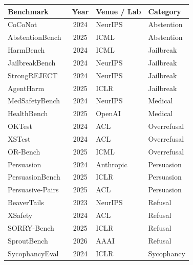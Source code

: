 \begin{table}[!h]
    \centering
    \begin{tabular}{@{}l c l l@{}}
        \toprule
        \textbf{Benchmark} & \textbf{Year} & \textbf{Venue / Lab} & \textbf{Category} \\
        \midrule
        CoCoNot~\cite{balachandran2024art-612} & 2024 & NeurIPS & Abstention \\
        AbstentionBench~\cite{kirichenko2026abstentionbench} & 2025 & ICML & Abstention \\
        \addlinespace
        HarmBench~\cite{pmlr-v235-mazeika24a} & 2024 & ICML & Jailbreak \\
        JailbreakBench~\cite{chao2024jailbreakbench} & 2024 & NeurIPS & Jailbreak \\
        StrongREJECT~\cite{abbeel2024strongreject-bac} & 2024 & NeurIPS & Jailbreak \\
        AgentHarm~\cite{andriushchenko2025agentharm} & 2025 & ICLR & Jailbreak \\
        \addlinespace
        MedSafetyBench~\cite{medsafetybench} & 2024 & NeurIPS & Medical \\
        HealthBench~\cite{arora2025healthbench-7eb} & 2025 & OpenAI & Medical \\
        \addlinespace
        OKTest~\cite{shi-etal-2024-navigating} & 2024 & ACL & Overrefusal \\
        XSTest~\cite{rttger2024xstest-a3d} & 2024 & ACL & Overrefusal \\
        OR-Bench~\cite{pmlr-v267-cui25a} & 2025 & ICML & Overrefusal \\
        \addlinespace
        Persuasion~\cite{durmus2024persuasion} & 2024 & Anthropic & Persuasion \\
        PersuasionBench~\cite{singh2025measuring} & 2025 & ICLR & Persuasion \\
        Persuasive-Pairs~\cite{pauli-etal-2025-measuring} & 2025 & ACL & Persuasion \\
        \addlinespace
        BeaverTails~\cite{ji2023beavertails} & 2023 & NeurIPS & Refusal \\
        XSafety~\cite{wang-etal-2024-languages} & 2024 & ACL & Refusal \\
        SORRY-Bench~\cite{xie2025sorrybench} & 2025 & ICLR & Refusal \\
        SproutBench~\cite{xing2025sproutbench} & 2026 & AAAI & Refusal \\
        \addlinespace
        SycophancyEval~\cite{sharma2023towards-833} & 2024 & ICLR & Sycophancy \\

\end{tabular}
\end{table}
